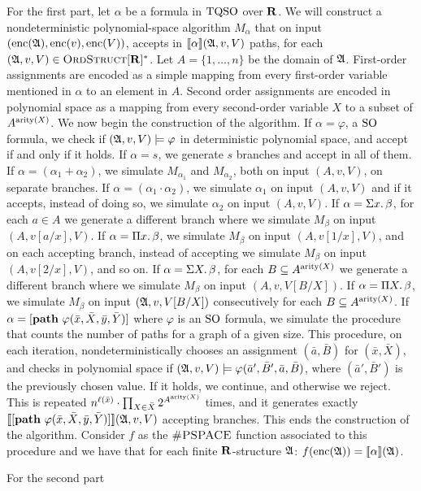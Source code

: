 \vspace{1em}
For the first part, let $\alpha$ be a formula in ${\rm TQSO}$ over $\mathbf{R}$. 
We will construct a nondeterministic polynomial-space algorithm $M_{\alpha}$ that on input $({\rm enc}(\mathfrak{A}),{\rm enc}(v),{\rm enc}(V))$, accepts in ${\llbracket{}{\alpha}\rrbracket}(\mathfrak{A},v,V)$ paths, for each $(\mathfrak{A},v,V)\in\text{\sc OrdStruct}[\mathbf{R}]^*$. Let $A = \{1,\ldots,n\}$  be the domain of $\mathfrak{A}$. 
First-order assignments are encoded as a simple mapping from every first-order variable mentioned in $\alpha$ to an element in $A$. 
Second order assignments are encoded in polynomial space as a mapping from every second-order variable $X$ to a subset of $A^{{\rm arity}(X)}$. We now begin the construction of the algorithm. 
If $\alpha = \varphi$, a ${\rm SO}$ formula, we check if $(\mathfrak{A},v,V)\models\varphi$ in deterministic polynomial space, and accept if and only if it holds. 
If $\alpha = s$, we generate $s$ branches and accept in all of them. 
If $\alpha = (\alpha_1 + \alpha_2)$, we simulate $M_{\alpha_1}$ and $M_{\alpha_2}$, both on input $(A,v,V)$, on separate branches. 
If $\alpha = (\alpha_1\cdot\alpha_2)$, we simulate $\alpha_1$ on input $(A,v,V)$ and if it accepts, instead of doing so, we simulate $\alpha_2$ on input $(A,v,V)$. 
If $\alpha = \Sigma{x}.\,\beta$, for each $a\in A$ we generate a different branch where we simulate $M_{\beta}$ on input $(A,v[a/x],V)$.
If $\alpha = \Pi{x}.\,\beta$, we simulate $M_{\beta}$ on input $(A,v[1/x],V)$, and on each accepting branch, instead of accepting we simulate $M_{\beta}$ on input $(A,v[2/x],V)$, and so on. 
If $\alpha = \Sigma{X}.\,\beta$, for each $B\subseteq A^{{\rm arity}(X)}$ we generate a different branch where we simulate $M_{\beta}$ on input $(A,v,V[B/X])$.
If $\alpha = \Pi{X}.\,\beta$, we simulate $M_{\beta}$ on input $(\mathfrak{A},v,V[B/X])$ consecutively for each $B\subseteq A^{{\rm arity}(X)}$. 
If $\alpha = [{\bf path} \,\, \varphi(\bar{x},\bar{X},\bar{y},\bar{Y})]$ where $\varphi$ is an ${\rm SO}$ formula, we simulate the procedure that counts the number of paths for a graph of a given size. This procedure, on each iteration, nondeterministically chooses an assignment $(\bar{a},\bar{B})$ for $(\bar{x},\bar{X})$, and checks in polynomial space if $(\mathfrak{A},v,V)\models\varphi(\bar{a}',\bar{B}',\bar{a},\bar{B})$, where $(\bar{a}',\bar{B}')$ is the previously chosen value. If it holds, we continue, and otherwise we reject. 
This is repeated $n^{\ell(\bar{x})}\cdot \prod_{X\in\bar{X}} 2^{A^{{\rm arity}(X)}}$ times, and it generates exactly ${\llbracket{}{[{\bf path} \,\, \varphi(\bar{x},\bar{X},\bar{y},\bar{Y})]}\rrbracket}(\mathfrak{A},v,V)$ accepting branches. 
This ends the construction of the algorithm. 
Consider $f$ as the $\text{\sc \#PSPACE}$ function associated to this procedure and we have that for each finite $\mathbf{R}$-structure $\mathfrak{A}$: $f({\rm enc}(\mathfrak{A})) = {\llbracket{}{\alpha}\rrbracket}(\mathfrak{A})$.

\vspace{1em}
For the second part 